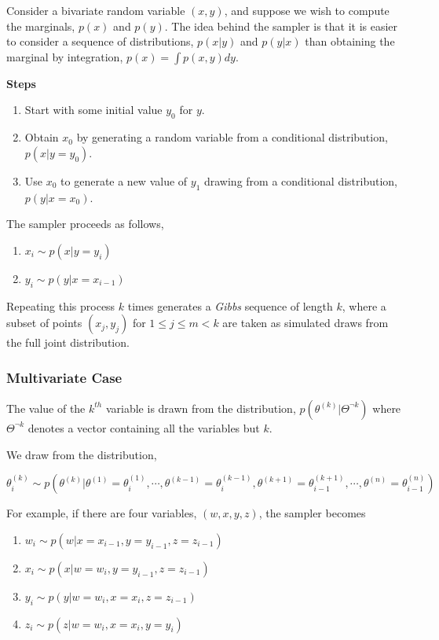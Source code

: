 \par
Consider a bivariate random variable \((x,y)\), and suppose we wish to compute the marginals, \(p(x)\) and \(p(y)\). The idea behind the
sampler is that it is easier to consider a sequence of distributions, \(p(x|y)\) and \(p(y|x)\) than obtaining the marginal by integration,
\(p(x) = \int p(x,y) dy\).

\textbf{Steps}

\begin{enumerate}
 \item Start with some initial value \(y_0\) for \(y\).
 \item Obtain \(x_0\) by generating a random variable from a conditional distribution, \(p(x|y=y_0)\).
 \item Use \(x_0\) to generate a new value of \(y_1\) drawing from a conditional distribution, \(p(y|x=x_0)\).
\end{enumerate}

The sampler proceeds as follows, 

\begin{enumerate}
 \item \(x_i \sim p(x|y=y_i)\)
 \item \(y_i \sim p(y|x=x_{i-1})\)
\end{enumerate}

Repeating this process \(k\) times generates a \textit{Gibbs} sequence of length \(k\), where a subset of points \((x_j,y_j)\) for 
\(1 \leq j \leq m < k\) are taken as simulated draws from the full joint distribution.

\subsubsection*{Multivariate Case}

The value of the \(k^{th}\) variable is drawn from the distribution, \(p(\theta^{(k)}|\Theta^{\neg k})\) where \(\Theta^{\neg k}\) denotes
a vector containing all the variables but \(k\). 

We draw from the distribution,

\(\theta_{i}^{(k)} \sim p(\theta^{(k)} | \theta^{(1)}=\theta_{i}^{(1)}, \cdots,\theta^{(k-1)}=\theta_{i}^{(k-1)},\theta^{(k+1)}=\theta_{i-1}^{(k+1)},\cdots,\theta^{(n)}=\theta_{i-1}^{(n)})\)

For example, if there are four variables, \((w,x,y,z)\), the sampler becomes

\begin{enumerate}
 \item \(w_i \sim p(w | x = x_{i-1}, y = y_{i-1}, z = z_{i-1})\)
 \item \(x_i \sim p(x | w = w_{i}, y = y_{i-1}, z = z_{i-1})\)
 \item \(y_i \sim p(y | w = w_{i}, x = x_{i}, z = z_{i-1})\)
 \item \(z_i \sim p(z | w = w_{i}, x = x_{i}, y = y_{i})\)
\end{enumerate}

